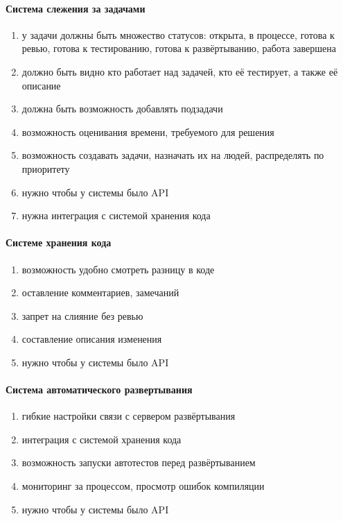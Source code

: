 \documentclass{article}
\begin{document}
\paragraph{Система слежения за задачами}
\begin{enumerate}
    \item{у задачи должны быть множество статусов:
    открыта, в процессе, готова к ревью, готова к тестированию, готова к развёртыванию, работа завершена}
    \item{должно быть видно кто работает над задачей, кто её тестирует, а также её описание}
    \item{должна быть возможность добавлять подзадачи}
    \item{возможность оценивания времени, требуемого для решения}
    \item{возможность создавать задачи, назначать их на людей, распределять по приоритету}
    \item{нужно чтобы у системы было API}
    \item{нужна интеграция с системой хранения кода}
\end{enumerate}

\paragraph{Системе хранения кода}
\begin{enumerate}
    \item{возможность удобно смотреть разницу в коде}
    \item{оставление комментариев, замечаний}
    \item{запрет на слияние без ревью}
    \item{составление описания изменения}
    \item{нужно чтобы у системы было API}
\end{enumerate}

\paragraph{Система автоматического развертывания}
\begin{enumerate}
    \item{гибкие настройки связи с сервером развёртывания}
    \item{интеграция с системой хранения кода}
    \item{возможность запуски автотестов перед развёртыванием}
    \item{мониторинг за процессом, просмотр ошибок компиляции}
    \item{нужно чтобы у системы было API}
\end{enumerate}
\end{document}
